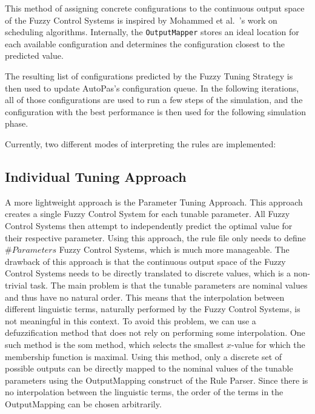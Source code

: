 This method of assigning concrete configurations to the continuous output space of the Fuzzy Control Systems is inspired by Mohammed et al.~\cite{Mohammed2022}'s work on scheduling algorithms. Internally, the \texttt{OutputMapper} stores an ideal location for each available configuration and determines the configuration closest to the predicted value.

The resulting list of configurations predicted by the Fuzzy Tuning Strategy is then used to update AutoPas's configuration queue. In the following iterations, all of those configurations are used to run a few steps of the simulation, and the configuration with the best performance is then used for the following simulation phase.

Currently, two different modes of interpreting the rules are implemented:

\subsection{Individual Tuning Approach}

A more lightweight approach is the Parameter Tuning Approach. This approach creates a single Fuzzy Control System for each tunable parameter. All Fuzzy Control Systems then attempt to independently predict the optimal value for their respective parameter. Using this approach, the rule file only needs to define $\#Parameters$ Fuzzy Control Systems, which is much more manageable. The drawback of this approach is that the continuous output space of the Fuzzy Control Systems needs to be directly translated to discrete values, which is a non-trivial task. The main problem is that the tunable parameters are nominal values and thus have no natural order. This means that the interpolation between different linguistic terms, naturally performed by the Fuzzy Control Systems, is not meaningful in this context. To avoid this problem, we can use a defuzzification method that does not rely on performing some interpolation. One such method is the \gls{som} method, which selects the smallest $x$-value for which the membership function is maximal. Using this method, only a discrete set of possible outputs can be directly mapped to the nominal values of the tunable parameters using the OutputMapping construct of the Rule Parser. Since there is no interpolation between the linguistic terms, the order of the terms in the OutputMapping can be chosen arbitrarily.


